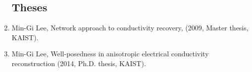 \documentclass[a4paper,11pt]{article}
\begin{document}
\begin{enumerate}
\subsection*{Theses}
\item Min-Gi Lee, Network approach to conductivity recovery, (2009, Master thesis, KAIST). %
\item Min-Gi Lee, Well-posedness in anisotropic electrical conductivity reconstruction (2014, Ph.D. thesis, KAIST). %
\end{enumerate}
\end{document}
